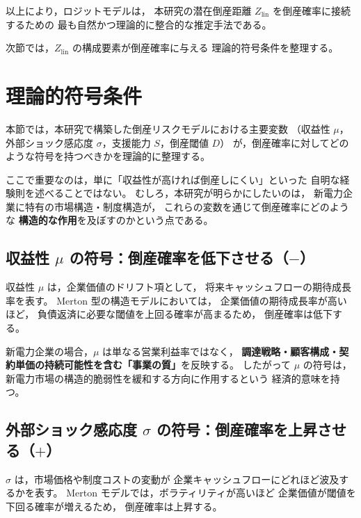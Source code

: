 以上により，ロジットモデルは，
本研究の潜在倒産距離 $Z_{\text{lin}}$ を倒産確率に接続するための
最も自然かつ理論的に整合的な推定手法である。

次節では，$Z_{\text{lin}}$ の構成要素が倒産確率に与える
理論的符号条件を整理する。




\section{理論的符号条件}

本節では，本研究で構築した倒産リスクモデルにおける主要変数
（収益性 $\mu$，外部ショック感応度 $\sigma$，支援能力 $S$，倒産閾値 $D$）
が，倒産確率に対してどのような符号を持つべきかを理論的に整理する。

ここで重要なのは，単に「収益性が高ければ倒産しにくい」といった
自明な経験則を述べることではない。
むしろ，本研究が明らかにしたいのは，
新電力企業に特有の市場構造・制度構造が，
これらの変数を通じて倒産確率にどのような
\textbf{構造的な作用}を及ぼすのかという点である。

\subsection*{収益性 $\mu$ の符号：倒産確率を低下させる（$-$）}

収益性 $\mu$ は，企業価値のドリフト項として，
将来キャッシュフローの期待成長率を表す。
Merton 型の構造モデルにおいては，
企業価値の期待成長率が高いほど，
負債返済に必要な閾値を上回る確率が高まるため，
倒産確率は低下する。

新電力企業の場合，$\mu$ は単なる営業利益率ではなく，
\textbf{調達戦略・顧客構成・契約単価の持続可能性を含む「事業の質」}を反映する。
したがって $\mu$ の符号は，
新電力市場の構造的脆弱性を緩和する方向に作用するという
経済的意味を持つ。

\subsection*{外部ショック感応度 $\sigma$ の符号：倒産確率を上昇させる（$+$）}

$\sigma$ は，市場価格や制度コストの変動が
企業キャッシュフローにどれほど波及するかを表す。
Merton モデルでは，ボラティリティが高いほど
企業価値が閾値を下回る確率が増えるため，
倒産確率は上昇する。

